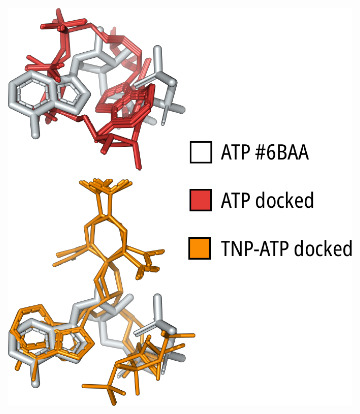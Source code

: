 \begin{figure}[h]
	\centering
	\begin{subfigure}[t]{0.30\textwidth}
		\caption{}\label{ch3fig:6baa_docking}
		\centering
		\includegraphics[width=\textwidth]{6baa_docking.pdf}
	\end{subfigure}
	\hfill
	\begin{subfigure}[t]{0.28\textwidth}
		\caption{}\label{ch3fig:6c3p_docking}
		\centering

\end{subfigure}
\end{figure}
